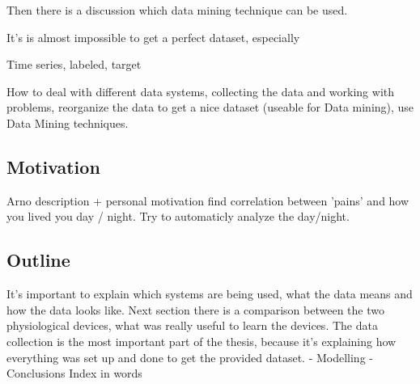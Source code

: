 		Then there is a discussion which data mining technique can be used. 


		It's is almost impossible to get a perfect dataset, especially 
			
		Time series, labeled, target

		How to deal with different data systems, collecting the data and working with problems, reorganize the data to get a nice dataset (useable for Data mining), use Data Mining techniques.
	\subsection{Motivation}
		Arno description + personal motivation
		find correlation between 'pains' and how you lived you day / night. 
		Try to automaticly analyze the day/night.

	\subsection{Outline}
		It's important to explain which systems are being used, what the data means and how the data looks like. Next section there is a comparison between the two physiological devices, what was really useful to learn the devices. The data collection is the most important part of the thesis, because it's explaining how everything was set up and done to get the provided dataset. - Modelling - Conclusions 
		Index in words
